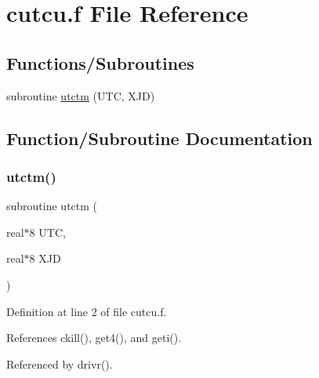 \hypertarget{cutcu_8f}{}\section{cutcu.\+f File Reference}
\label{cutcu_8f}
\subsection*{Functions/\+Subroutines}
\begin{DoxyCompactItemize}
\item 
subroutine \hyperlink{cutcu_8f_ae4ed76d4df3d106a12d6401708b64885}{utctm} (U\+TC, X\+JD)
\end{DoxyCompactItemize}


\subsection{Function/\+Subroutine Documentation}
\mbox{\label{cutcu_8f_ae4ed76d4df3d106a12d6401708b64885}} 
\subsubsection{\texorpdfstring{utctm()}{utctm()}}
{\footnotesize\ttfamily subroutine utctm (\begin{DoxyParamCaption}\item[{real$\ast$8}]{U\+TC,  }\item[{real$\ast$8}]{X\+JD }\end{DoxyParamCaption})}



Definition at line 2 of file cutcu.\+f.



References ckill(), get4(), and geti().



Referenced by drivr().

